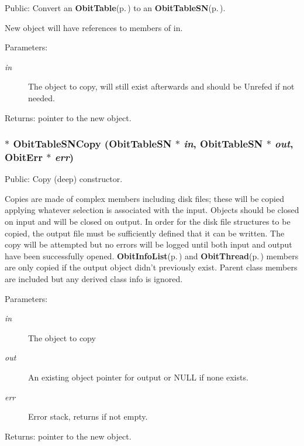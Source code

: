 Public: Convert an {\bf Obit\-Table}{\rm (p.\,\pageref{structObitTable})} to an {\bf Obit\-Table\-SN}{\rm (p.\,\pageref{structObitTableSN})}. 

New object will have references to members of in. \begin{Desc}
\item[Parameters:]
\begin{description}
\item[{\em in}]The object to copy, will still exist afterwards and should be Unrefed if not needed. \end{description}
\end{Desc}
\begin{Desc}
\item[Returns:]pointer to the new object. \end{Desc}
\subsubsection{$\ast$ Obit\-Table\-SNCopy ({\bf Obit\-Table\-SN} $\ast$ {\em in}, {\bf Obit\-Table\-SN} $\ast$ {\em out}, {\bf Obit\-Err} $\ast$ {\em err})}\label{ObitTableSN_8h_a14}


Public: Copy (deep) constructor. 

Copies are made of complex members including disk files; these will be copied applying whatever selection is associated with the input. Objects should be closed on input and will be closed on output. In order for the disk file structures to be copied, the output file must be sufficiently defined that it can be written. The copy will be attempted but no errors will be logged until both input and output have been successfully opened. {\bf Obit\-Info\-List}{\rm (p.\,\pageref{structObitInfoList})} and {\bf Obit\-Thread}{\rm (p.\,\pageref{structObitThread})} members are only copied if the output object didn't previously exist. Parent class members are included but any derived class info is ignored. \begin{Desc}
\item[Parameters:]
\begin{description}
\item[{\em in}]The object to copy \item[{\em out}]An existing object pointer for output or NULL if none exists. \item[{\em err}]Error stack, returns if not empty. \end{description}
\end{Desc}
\begin{Desc}
\item[Returns:]pointer to the new object. \end{Desc}
